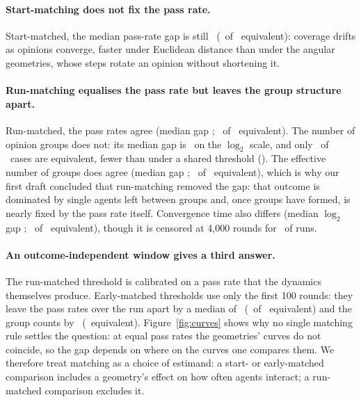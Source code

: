 \documentclass[11pt]{article}
\begin{document}
\paragraph{Start-matching does not fix the pass rate.}
Start-matched, the median pass-rate gap is still \VTzeroPassGap\ (\VTzeroPassEquiv\ of \VCases\ equivalent): coverage drifts as opinions converge, faster under Euclidean distance than under the angular geometries, whose steps rotate an opinion without shortening it.

\paragraph{Run-matching equalises the pass rate but leaves the group structure apart.}
Run-matched, the pass rates agree (median gap \VRunPassGap; \VRunPassEquiv\ of \VCases\ equivalent).
The number of opinion groups does not: its median gap is \VRunGroupGap\ on the $\log_2$ scale, and only \VRunGroupEquiv\ of \VCases\ cases are equivalent, fewer than under a shared threshold (\VRawGroupEquiv).
The effective number of groups does agree (median gap \VRunEffGroupsGap; \VRunEffGroupsEquiv\ of \VCases\ equivalent), which is why our first draft concluded that run-matching removed the gap: that outcome is dominated by single agents left between groups and, once groups have formed, is nearly fixed by the pass rate itself.
Convergence time also differs (median $\log_2$ gap \VRunConvGap; \VRunConvEquiv\ of \VCases\ equivalent), though it is censored at 4{,}000 rounds for \VConvCensored\ of runs.

\paragraph{An outcome-independent window gives a third answer.}
The run-matched threshold is calibrated on a pass rate that the dynamics themselves produce.
Early-matched thresholds use only the first 100 rounds: they leave the pass rates over the run apart by a median of \VEarlyPassGap\ (\VEarlyPassEquiv\ of \VCases\ equivalent) and the group counts by \VEarlyGroupGap\ (\VEarlyGroupEquiv\ equivalent).
Figure~\ref{fig:curves} shows why no single matching rule settles the question: at equal pass rates the geometries' curves do not coincide, so the gap depends on where on the curves one compares them.
We therefore treat matching as a choice of estimand: a start- or early-matched comparison includes a geometry's effect on how often agents interact; a run-matched comparison excludes it.
\end{document}
